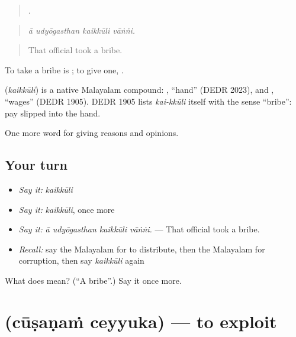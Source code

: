 \begin{quote}
   .
\end{quote}

\begin{quote}
\emph{ā udyōgasthan kaikkūli vāṅṅi.}
\end{quote}

\begin{quote}
That official took a bribe.
\end{quote}

To take a bribe is  ; to give one,  .

\begin{cousinweb}
\textbf{} (\emph{kaikkūli}) is a native Malayalam compound: , \textquotedblleft{}hand\textquotedblright{} (DEDR 2023), and , \textquotedblleft{}wages\textquotedblright{} (DEDR 1905). DEDR 1905 lists \emph{kai-kkūli} itself with the sense \textquotedblleft{}bribe\textquotedblright{}: pay slipped into the hand.
\end{cousinweb}

\begin{grammarlens}[title={What you've built}]
One more word for giving reasons and opinions.
\end{grammarlens}

\subsection*{Your turn}
\begin{itemize}
\raggedright
  \item \emph{Say it:} \emph{kaikkūli}
  \item \emph{Say it:} \emph{kaikkūli}, once more
  \item \emph{Say it:} \emph{ā udyōgasthan kaikkūli vāṅṅi.} — That official took a bribe.
  \item \emph{Recall:} say the Malayalam for to distribute, then the Malayalam for corruption, then say \emph{kaikkūli} again
\end{itemize}

\begin{tcolorbox}[breakable,colback=teal!4,colframe=teal!35!black,title={Before you move on}]
What does  mean? (\textquotedblleft{}A bribe\textquotedblright{}.) Say it once more.
\end{tcolorbox}
\section[\texorpdfstring{\ml{ചൂഷണം} \ml{ചെയ്യുക} (cūṣaṇaṁ ceyyuka)}{ചൂഷണം ചെയ്യുക (cūṣaṇaṁ ceyyuka)}]{  (cūṣaṇaṁ ceyyuka) — to exploit}

